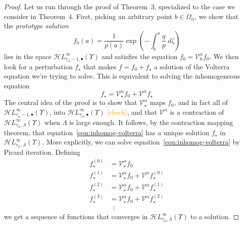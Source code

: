 \documentclass{article}
\newcommand{\singexp}[2]{\mathcal{H}L^\infty_{#1, #2}}
\newcommand{\singexpalg}[1]{\singexp{#1}{\bullet}}
\newcommand{\volterra}{\mathcal{V}}
\newcommand{\hardpart}{\mathcal{V}_0}
\newcommand{\softpart}{\mathcal{V}_\star}
\newcommand{\solwhole}{f}
\newcommand{\solproto}{f_0}
\newcommand{\solptb}{f_\star}
\theoremstyle{definition}
\theoremstyle{plain}
\begin{document}
\begin{proof}
Let us run through the proof of Theorem~3, specialized to the case we consider in Theorem~4. First, picking an arbitrary point $b \in \Omega_\alpha$, we show that the {\em prototype solution}
\[ \solproto(a) = \frac{1}{p(a)} \exp\left(-\int_{b}^{a}\frac{q}{p}\;d\zeta\right) \]
lies in the space $\singexpalg{\tau_\alpha - 1}(\Upsilon)$ and satisfies the equation $\solproto = \hardpart^\alpha \solproto$. We then look for a perturbation $\solptb$ that makes $\solwhole = \solproto + \solptb$ a solution of the Volterra equation we're trying to solve. This is equivalent to solving the inhomogeneous equation
\begin{equation}\label{eqn:inhomog-volterra}
\solptb = \softpart^\alpha \solproto + \volterra^\alpha \solptb
\end{equation}
The central idea of the proof is to show that $\softpart^\alpha$ maps $\solproto$, and in fact all of $\singexpalg{\tau_\alpha - 1}(\Upsilon)$, into $\singexpalg{\tau_\alpha}(\Upsilon)$ \textcolor{orange}{[check]}, and that $\volterra^\alpha$ is a contraction of $\singexp{\tau_\alpha}{\Lambda}(\Upsilon)$ when $\Lambda$ is large enough. It follows, by the contraction mapping theorem, that equation~\eqref{eqn:inhomog-volterra} has a unique solution $\solptb$ in $\singexp{\tau_\alpha}{\Lambda}(\Upsilon)$. More explicitly, we can solve equation~\eqref{eqn:inhomog-volterra} by Picard iteration. Defining
\begin{align*}
\solptb^{(0)} & = \softpart^\alpha \solproto \\
\solptb^{(1)} & = \softpart^\alpha \solproto + \volterra^\alpha \solptb^{(0)} \\
\solptb^{(2)} & = \softpart^\alpha \solproto + \volterra^\alpha \solptb^{(1)} \\
\solptb^{(3)} & = \softpart^\alpha \solproto + \volterra^\alpha \solptb^{(2)} \\
& \;\;\vdots
\end{align*}
we get a sequence of functions that converges in $\singexp{\tau_\alpha}{\Lambda}(\Upsilon)$ to a solution.


\end{proof}
\end{document}
